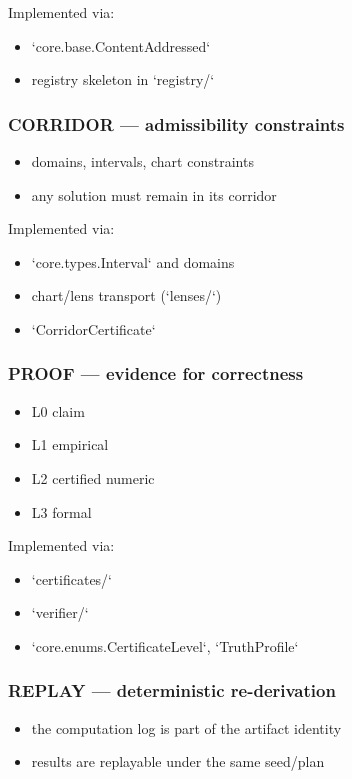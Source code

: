 \documentclass[11pt]{article}
\begin{document}
Implemented via:
\begin{itemize}
\item `core.base.ContentAddressed`
\item registry skeleton in `registry/`
\end{itemize}

\subsubsection{CORRIDOR — admissibility constraints}
\begin{itemize}
\item domains, intervals, chart constraints
\item any solution must remain in its corridor
\end{itemize}

Implemented via:
\begin{itemize}
\item `core.types.Interval` and domains
\item chart/lens transport (`lenses/`)
\item `CorridorCertificate`
\end{itemize}

\subsubsection{PROOF — evidence for correctness}
\begin{itemize}
\item L0 claim
\item L1 empirical
\item L2 certified numeric
\item L3 formal
\end{itemize}

Implemented via:
\begin{itemize}
\item `certificates/`
\item `verifier/`
\item `core.enums.CertificateLevel`, `TruthProfile`
\end{itemize}

\subsubsection{REPLAY — deterministic re-derivation}
\begin{itemize}
\item the computation log is part of the artifact identity
\item results are replayable under the same seed/plan
\end{itemize}
\end{document}
